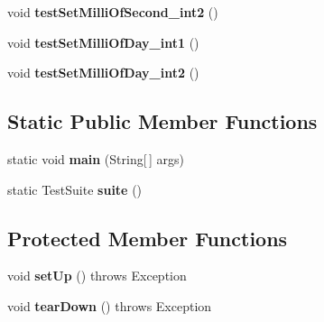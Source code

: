 \begin{DoxyCompactItemize}
\item 
\hypertarget{classorg_1_1joda_1_1time_1_1_test_mutable_date_time___sets_a82e830a28649ad49aeec80276a4ee775}{void {\bfseries test\-Set\-Milli\-Of\-Second\-\_\-int2} ()}\label{classorg_1_1joda_1_1time_1_1_test_mutable_date_time___sets_a82e830a28649ad49aeec80276a4ee775}

\item 
\hypertarget{classorg_1_1joda_1_1time_1_1_test_mutable_date_time___sets_a2a075d7c9283877679cc3664bb6aa395}{void {\bfseries test\-Set\-Milli\-Of\-Day\-\_\-int1} ()}\label{classorg_1_1joda_1_1time_1_1_test_mutable_date_time___sets_a2a075d7c9283877679cc3664bb6aa395}

\item 
\hypertarget{classorg_1_1joda_1_1time_1_1_test_mutable_date_time___sets_a803d81ca67916c993861ba9b434bb2bc}{void {\bfseries test\-Set\-Milli\-Of\-Day\-\_\-int2} ()}\label{classorg_1_1joda_1_1time_1_1_test_mutable_date_time___sets_a803d81ca67916c993861ba9b434bb2bc}

\end{DoxyCompactItemize}
\subsection*{Static Public Member Functions}
\begin{DoxyCompactItemize}
\item 
\hypertarget{classorg_1_1joda_1_1time_1_1_test_mutable_date_time___sets_a104670c81c49a0c9cb967220aaf0d95a}{static void {\bfseries main} (String\mbox{[}$\,$\mbox{]} args)}\label{classorg_1_1joda_1_1time_1_1_test_mutable_date_time___sets_a104670c81c49a0c9cb967220aaf0d95a}

\item 
\hypertarget{classorg_1_1joda_1_1time_1_1_test_mutable_date_time___sets_a42869f371900242300f38f798e4c2d46}{static Test\-Suite {\bfseries suite} ()}\label{classorg_1_1joda_1_1time_1_1_test_mutable_date_time___sets_a42869f371900242300f38f798e4c2d46}

\end{DoxyCompactItemize}
\subsection*{Protected Member Functions}
\begin{DoxyCompactItemize}
\item 
\hypertarget{classorg_1_1joda_1_1time_1_1_test_mutable_date_time___sets_a7d60c6d388fdd445af83640630b684b6}{void {\bfseries set\-Up} ()  throws Exception }\label{classorg_1_1joda_1_1time_1_1_test_mutable_date_time___sets_a7d60c6d388fdd445af83640630b684b6}

\item 
\hypertarget{classorg_1_1joda_1_1time_1_1_test_mutable_date_time___sets_aa29af4f11e22f91c6c816b92e0600b1c}{void {\bfseries tear\-Down} ()  throws Exception }\label{classorg_1_1joda_1_1time_1_1_test_mutable_date_time___sets_aa29af4f11e22f91c6c816b92e0600b1c}

\end{DoxyCompactItemize}


